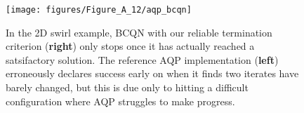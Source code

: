 \begin{figure}[h]
\centering
\vspace{16pt}
\texttt{[image: figures/Figure\_A\_12/aqp\_bcqn]}
\caption{In the 2D swirl example, BCQN with our reliable termination criterion
(\textbf{right}) only stops once it has actually reached a satsifactory solution.
The reference AQP implementation (\textbf{left}) erroneously declares success
early on when it finds two iterates have barely changed, but this is due only
to hitting a difficult configuration where AQP struggles to make progress.}
\label{fig:aqp_stop}
\end{figure}


